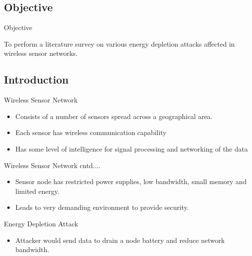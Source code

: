 \subsection{Objective}
\begin{frame}{Objective}
   \begin{itemize}
   To perform a literature survey on various energy depletion attacks affected in wireless sensor networks.

   \end{itemize}
 \end{frame}  

\subsection{Introduction}
\begin{frame}{Wireless Sensor Network}
   \begin{itemize}
  \item Consists of a number of sensors spread across a geographical area. 
  \item Each sensor has wireless communication capability 
   \item Has some level of intelligence for signal processing and networking of the data
   \end{itemize}
 \end{frame} 
 

\begin{frame}{Wireless Sensor Network cntd....}  
   \begin{itemize}
  \item Sensor node has restricted power supplies, low bandwidth, small memory and limited energy. 
  \item Leads to very demanding environment to provide security. 
   \end{itemize}
 \end{frame} 

\begin{frame}{Energy Depletion Attack}
 \begin{itemize}
  \item Attacker would send data to drain a node battery and reduce network bandwidth.  
   \end{itemize}
 \end{frame} 

